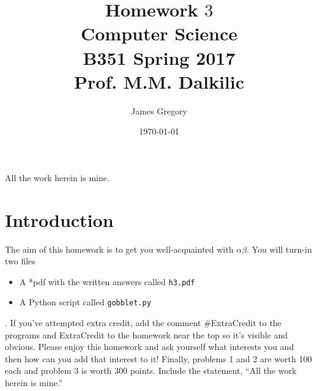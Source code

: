 \documentclass{article}
\begin{document}
\title{Homework $3$\\ Computer Science \\ B351 Spring 2017\\ Prof. M.M. Dalkilic}         %
\author{James Gregory}        %
\date{\today}          %
\maketitle


\makeatother     %




\pagestyle{plain}
All the work herein is mine.
\section*{Introduction}
The aim of this homework is to get you well-acquainted with $\alpha\beta$. You will turn-in two files\begin{itemize} \item A *pdf with the written answers called \texttt{h3.pdf} \item A Python script called \texttt{gobblet.py}\end{itemize}.  If you've attempted extra credit, add the comment \#ExtraCredit to the programs and ExtraCredit to the homework near the top so it's visible and obvious. Please enjoy this homework and ask yourself what interests you and then how can you add that interest to it!  Finally, problems 1 and 2 are worth 100 each and problem 3 is worth 300 points. Include the statement, ``All the work herein is mine.''
\newpage
\end{document}

